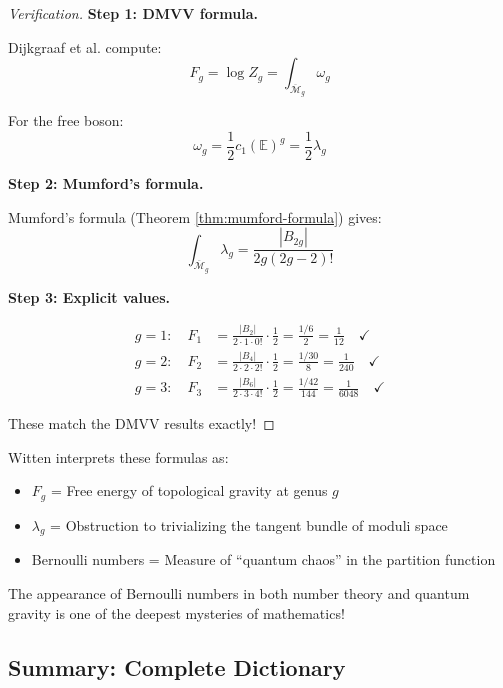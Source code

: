 \begin{proof}[Verification]

\textbf{Step 1: DMVV formula.}

Dijkgraaf et al. compute:
$$F_g = \log Z_g = \int_{\overline{\mathcal{M}}_g} \omega_g$$

For the free boson:
$$\omega_g = \frac{1}{2} c_1(\mathbb{E})^g = \frac{1}{2} \lambda_g$$

\textbf{Step 2: Mumford's formula.}

Mumford's formula (Theorem \ref{thm:mumford-formula}) gives:
$$\int_{\overline{\mathcal{M}}_g} \lambda_g = \frac{|B_{2g}|}{2g(2g-2)!}$$

\textbf{Step 3: Explicit values.}

\begin{align}
g=1: \quad F_1 &= \frac{|B_2|}{2 \cdot 1 \cdot 0!} \cdot \frac{1}{2} 
= \frac{1/6}{2} = \frac{1}{12} \quad \checkmark \\
g=2: \quad F_2 &= \frac{|B_4|}{2 \cdot 2 \cdot 2!} \cdot \frac{1}{2} 
= \frac{1/30}{8} = \frac{1}{240} \quad \checkmark \\
g=3: \quad F_3 &= \frac{|B_6|}{2 \cdot 3 \cdot 4!} \cdot \frac{1}{2} 
= \frac{1/42}{144} = \frac{1}{6048} \quad \checkmark
\end{align}

These match the DMVV results exactly!
\end{proof}

\begin{remark}\label{rem:witten-perspective}
Witten interprets these formulas as:
\begin{itemize}
\item $F_g$ = Free energy of topological gravity at genus $g$
\item $\lambda_g$ = Obstruction to trivializing the tangent bundle of moduli space
\item Bernoulli numbers = Measure of ``quantum chaos'' in the partition function
\end{itemize}

The appearance of Bernoulli numbers in both number theory and quantum gravity is 
one of the deepest mysteries of mathematics!
\end{remark}

\subsection{Summary: Complete Dictionary}
\label{subsec:heisenberg-dictionary-complete}

